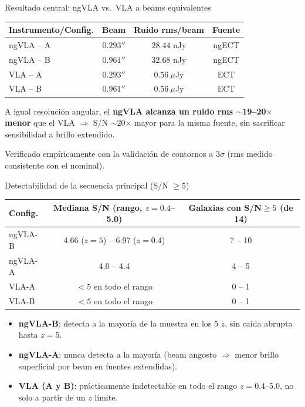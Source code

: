 \documentclass[12pt,aspectratio=169]{beamer}
\begin{document}
\begin{frame}{Resultado central: ngVLA vs.\ VLA a beams equivalentes}
    \begin{center}
    \begin{tabular}{lccc}
    \toprule
    Instrumento/Config. & Beam & Ruido rms/beam & Fuente \\
    \midrule
    ngVLA -- A & $0.293''$ & $28.44$ nJy & ngECT \\
    ngVLA -- B & $0.961''$ & $32.68$ nJy & ngECT \\
    VLA -- A   & $0.293''$ & $0.56\ \mu$Jy & ECT \\
    VLA -- B   & $0.961''$ & $0.56\ \mu$Jy & ECT \\
    \bottomrule
    \end{tabular}
    \end{center}
    \begin{alertblock}{}
        A igual resolución angular, el \textbf{ngVLA alcanza un ruido rms
        $\sim$19--20$\times$ menor} que el VLA $\Rightarrow$ S/N
        $\sim$20$\times$ mayor para la misma fuente, sin sacrificar
        sensibilidad a brillo extendido.
    \end{alertblock}
    \small Verificado empíricamente con la validación de contornos a
    3$\sigma$ (rms medido consistente con el nominal).
\end{frame}

\begin{frame}{Detectabilidad de la secuencia principal (S/N $\geq 5$)}
    \begin{center}
    \small
    \begin{tabular}{lcc}
    \toprule
    Config. & Mediana S/N (rango, $z=0.4$--5.0) & Galaxias con S/N$\geq5$ (de 14) \\
    \midrule
    ngVLA-B & 4.66 ($z{=}5$) -- 6.97 ($z{=}0.4$) & 7 -- 10 \\
    ngVLA-A & 4.0 -- 4.4 & 4 -- 5 \\
    VLA-A   & $<5$ en todo el rango & 0 -- 1 \\
    VLA-B   & $<5$ en todo el rango & 0 -- 1 \\
    \bottomrule
    \end{tabular}
    \end{center}
    \begin{itemize}
        \item \textbf{ngVLA-B}: detecta a la mayoría de la muestra en los
        5 $z$, sin caída abrupta hasta $z=5$.
        \item \textbf{ngVLA-A}: nunca detecta a la mayoría (beam angosto
        $\Rightarrow$ menor brillo superficial por beam en fuentes
        extendidas).
        \item \textbf{VLA (A y B)}: prácticamente indetectable en todo el
        rango $z=0.4$--5.0, no solo a partir de un $z$ límite.
    \end{itemize}
\end{frame}
\end{document}
